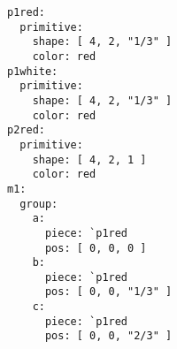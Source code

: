 \begin{verbatim}
p1red:
  primitive:
    shape: [ 4, 2, "1/3" ]
    color: red
p1white:
  primitive:
    shape: [ 4, 2, "1/3" ]
    color: red
p2red:
  primitive:
    shape: [ 4, 2, 1 ]
    color: red
m1:
  group:
    a:
      piece: `p1red
      pos: [ 0, 0, 0 ]
    b:
      piece: `p1red
      pos: [ 0, 0, "1/3" ]
    c:
      piece: `p1red
      pos: [ 0, 0, "2/3" ]

\end{verbatim}